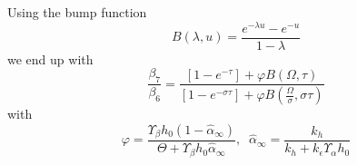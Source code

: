 \documentclass[aps,onecolumn,12pt]{revtex4}
\begin{document}
Using the bump function
\begin{equation}
	B(\lambda,u) = \dfrac{e^{-\lambda u}-e^{-u}}{1-\lambda}
\end{equation}
we end up with
\begin{equation}
	\dfrac{\beta_7}{\beta_6} = 
	\dfrac{\left[1-e^{-\tau}\right] + \varphi B(\Omega,\tau) }
	{\left[1-e^{-\sigma\tau}\right] + \varphi B(\frac{\Omega}{\sigma},\sigma\tau)}
\end{equation}
with
\begin{equation}
	\varphi = \dfrac{\Upsilon_\beta h_0 \left(1-\hat\alpha_\infty\right)}{\Theta+\Upsilon_\beta h_0 \hat\alpha_\infty}
	,\;\; \hat\alpha_\infty = \dfrac{k_h}{k_h+k_\epsilon \Upsilon_\alpha h_0 }
\end{equation}
\end{document}
